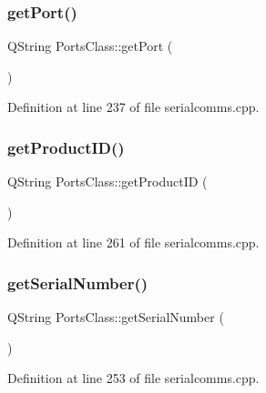 \mbox{\label{classPortsClass_a0aba12c54c3293a67b28bfc1835b0fd6}} 
\subsubsection{\texorpdfstring{getPort()}{getPort()}}
{\footnotesize\ttfamily Q\+String Ports\+Class\+::get\+Port (\begin{DoxyParamCaption}{ }\end{DoxyParamCaption})}



Definition at line 237 of file serialcomms.\+cpp.

\mbox{\label{classPortsClass_a3f8207b8a5519b494aa8ae602019aa32}} 
\subsubsection{\texorpdfstring{getProductID()}{getProductID()}}
{\footnotesize\ttfamily Q\+String Ports\+Class\+::get\+Product\+ID (\begin{DoxyParamCaption}{ }\end{DoxyParamCaption})}



Definition at line 261 of file serialcomms.\+cpp.

\mbox{\label{classPortsClass_a0fad2da57c4cf364bda2389149844bf7}} 
\subsubsection{\texorpdfstring{getSerialNumber()}{getSerialNumber()}}
{\footnotesize\ttfamily Q\+String Ports\+Class\+::get\+Serial\+Number (\begin{DoxyParamCaption}{ }\end{DoxyParamCaption})}



Definition at line 253 of file serialcomms.\+cpp.

\mbox{\label{classPortsClass_ab855ef36f83175d9178d6c8fde0129cb}} 
